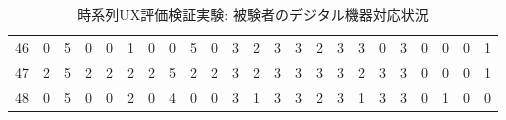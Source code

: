 \begin{table}[htbp]
{\begin{tabular}{lllllllllllllllllllllll}
46                  & 0 & 5 & 0 & 0 & 1 & 0 & 0 & 5 & 0 & 3 & 2 & 3 & 3 & 2 & 3 & 3 & 0 & 3 & 0                  & 0                   & 0                   & 1                   \\
47                  & 2 & 5 & 2 & 2 & 2 & 2 & 5 & 2 & 2 & 3 & 2 & 3 & 3 & 3 & 3 & 2 & 3 & 3 & 0                  & 0                   & 0                   & 1                   \\
48                  & 0 & 5 & 0 & 0 & 2 & 0 & 4 & 0 & 0 & 3 & 1 & 3 & 3 & 2 & 3 & 1 & 3 & 3 & 0                  & 1                   & 0                   & 0                   \\ \hline
\end{tabular}
}
\caption{時系列UX評価検証実験: 被験者のデジタル機器対応状況}
\label{table:exp2result2}
\end{table}
